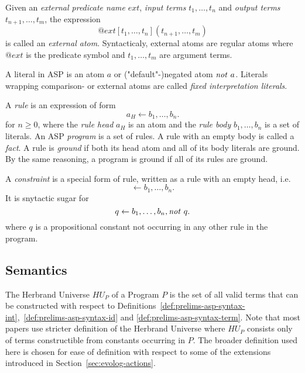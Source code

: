 \begin{definition}
\label{def:prelims-asp-syntax-ext-atom}
Given an \emph{external predicate name} $\mathit{ext}$, \emph{input terms} $t_1,\ldots,t_n$ and \emph{output terms} $t_{n+1},\ldots,t_m$, the expression
\[
	@\mathit{ext}[t_1,\ldots,t_n](t_{n+1},\ldots,t_m)
\]
is called an \emph{external atom}. Syntacticaly, external atoms are regular atoms where $@\mathit{ext}$ is the predicate symbol and $t_1,\ldots,t_m$ are argument terms.
\end{definition}

\begin{definition}[Literal]
\label{def:prelims-asp-syntax-literal}
A literal in ASP is an atom $a$ or ("default"-)negated atom $\mathit{not}\ a$. Literals wrapping comparison- or external atoms are called \emph{fixed interpretation literals}.
\end{definition}

\begin{definition}
\label{def:prelims-asp-syntax-rule}
A \emph{rule} is an expression of form
\[
	a_H \leftarrow b_1,\ldots,b_n.
\]
for $n \geq 0$, where the \emph{rule head} $a_H$ is an atom and the \emph{rule body} $b_1,\ldots,b_n$ is a set of literals. An ASP \emph{program} is a set of rules. A rule with an empty body is called a \emph{fact}. A rule is \emph{ground} if both its head atom and all of its body literals are ground. By the same reasoning, a program is ground if all of its rules are ground.
\end{definition}


\begin{definition}[Constraint]
\label{def:prelims-asp-syntax-constraint}
A \emph{constraint} is a special form of rule, written as a rule with an empty head, i.e.
\[
	\leftarrow b_1,\ldots,b_n.
\]
It is snytactic sugar for
\[
	q \leftarrow b_1,\ldots,b_n, \mathit{not}\ q.
\]
where $q$ is a propositional constant not occurring in any other rule in the program.
\end{definition}

\subsection{Semantics}
\label{subsec:prelims-asp-semantics}

\begin{definition}
\label{def:prelims-asp-semantics-hu}
The Herbrand Universe $HU_P$ of a Program $P$ is the set of all valid terms that can be constructed with respect to Definitions~\ref{def:prelims-asp-syntax-int},~\ref{def:prelims-asp-syntax-id} and \ref{def:prelims-asp-syntax-term}.
Note that most papers use stricter definition of the Herbrand Universe where $HU_P$ consists only of terms constructible from constants occurring in $P$. The broader definition used here is chosen for ease of definition with respect to some of the extensions introduced in Section~\ref{sec:evolog-actions}.
\end{definition}


